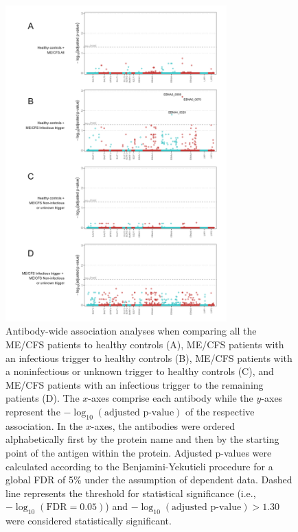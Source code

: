 \begin{figure}
    \centering
    \includegraphics[width=0.76\textwidth]{chapter/2022-revisiting-igg/figures/fig2-awas-mecfs.png}
    \caption[Antibody-wide association analyses when comparing ME/CFS to healthy controls]{Antibody-wide association analyses when comparing all the ME/CFS patients to healthy controls (A), ME/CFS patients with an infectious trigger to healthy controls (B), ME/CFS patients with a noninfectious or unknown trigger to healthy controls (C), and ME/CFS patients with an infectious trigger to the remaining patients (D). The $x$-axes comprise each antibody while the $y$-axes represent the $-\log_{10}(\text{adjusted p-value})$ of the respective association. In the $x$-axes, the antibodies were ordered alphabetically first by the protein name and then by the starting point of the antigen within the protein. Adjusted p-values were calculated according to the Benjamini-Yekutieli procedure for a global FDR of 5\% under the assumption of dependent data. Dashed line represents the threshold for statistical significance (i.e., $-\log_{10}(\text{FDR}=0.05)$) and $-\log_{10}(\text{adjusted p-value})>1.30$ were considered statistically significant.}
    \label{fig:fig2-awas-mecfs}
\end{figure}


